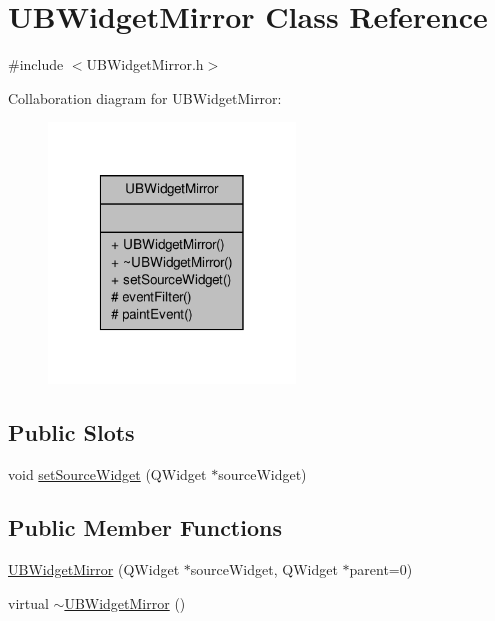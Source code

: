 \hypertarget{class_u_b_widget_mirror}{\section{U\-B\-Widget\-Mirror Class Reference}
\label{d4/d4e/class_u_b_widget_mirror}
}


{\ttfamily \#include $<$U\-B\-Widget\-Mirror.\-h$>$}



Collaboration diagram for U\-B\-Widget\-Mirror\-:
\nopagebreak
\begin{figure}[H]
\begin{center}
\leavevmode
\includegraphics[width=186pt]{da/d81/class_u_b_widget_mirror__coll__graph}
\end{center}
\end{figure}
\subsection*{Public Slots}
\begin{DoxyCompactItemize}
\item 
void \hyperlink{class_u_b_widget_mirror_a487be189fd4d25cfce849308b0c8d3ee}{set\-Source\-Widget} (Q\-Widget $\ast$source\-Widget)
\end{DoxyCompactItemize}
\subsection*{Public Member Functions}
\begin{DoxyCompactItemize}
\item 
\hyperlink{class_u_b_widget_mirror_a138e00a6d349320ba8de04cba2b4c0af}{U\-B\-Widget\-Mirror} (Q\-Widget $\ast$source\-Widget, Q\-Widget $\ast$parent=0)
\item 
virtual \hyperlink{class_u_b_widget_mirror_a224f6065a2aac027779cdf6c418df928}{$\sim$\-U\-B\-Widget\-Mirror} ()
\end{DoxyCompactItemize}
